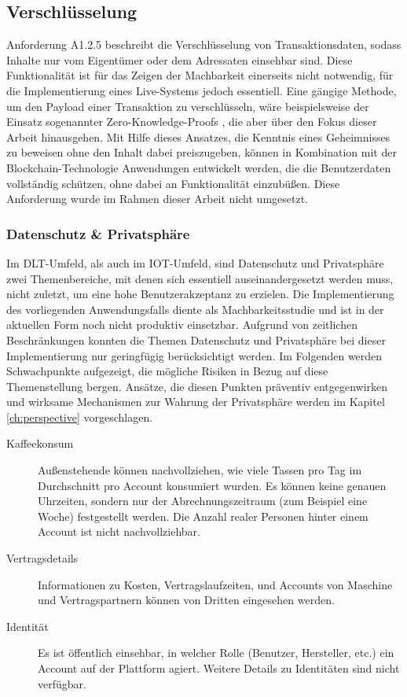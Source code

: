 \subsection{Verschlüsselung}
\label{subsec:implementation:requirements:encryption}
Anforderung A1.2.5 beschreibt die Verschlüsselung von Transaktionsdaten, sodass Inhalte nur vom Eigentümer oder dem Adressaten einsehbar sind. Diese Funktionalität ist für das Zeigen der Machbarkeit einerseits nicht notwendig, für die Implementierung eines Live-Systems jedoch essentiell. Eine gängige Methode, um den Payload einer Transaktion zu verschlüsseln, wäre beispielsweise der Einsatz sogenannter Zero-Knowledge-Proofs \cite{zeroknowledge2020}, die aber über den Fokus dieser Arbeit hinausgehen. Mit Hilfe dieses Ansatzes, die Kenntnis eines Geheimnisses zu beweisen ohne den Inhalt dabei preiszugeben, können in Kombination mit der Blockchain-Technologie Anwendungen entwickelt werden, die die Benutzerdaten vollständig schützen, ohne dabei an Funktionalität einzubüßen. Diese Anforderung wurde im Rahmen dieser Arbeit nicht umgesetzt.\\

\subsubsection{Datenschutz \& Privatsphäre}
\label{subsub:implementation:requirements:encryption:privacy}
Im \ac{DLT}-Umfeld, als auch im \ac{IOT}-Umfeld, sind Datenschutz und Privatsphäre zwei Themenbereiche, mit denen sich essentiell auseinandergesetzt werden muss, nicht zuletzt, um eine hohe Benutzerakzeptanz zu erzielen. Die Implementierung des vorliegenden Anwendungsfalls diente als Machbarkeitsstudie und ist in der aktuellen Form noch nicht produktiv einsetzbar. Aufgrund von zeitlichen Beschränkungen konnten die Themen Datenschutz und Privatsphäre bei dieser Implementierung nur geringfügig berücksichtigt werden. Im Folgenden werden Schwachpunkte aufgezeigt, die mögliche Risiken in Bezug auf diese Themenstellung bergen. Ansätze, die diesen Punkten präventiv entgegenwirken und wirksame Mechanismen zur Wahrung der Privatsphäre werden im Kapitel \ref{ch:perspective} vorgeschlagen.\\
\begin{description}
  \item[Kaffeekonsum] Außenstehende können nachvollziehen, wie viele Tassen pro Tag im Durchschnitt pro Account konsumiert wurden. Es können keine genauen Uhrzeiten, sondern nur der Abrechnungszeitraum (zum Beispiel eine Woche) festgestellt werden. Die Anzahl realer Personen hinter einem Account ist nicht nachvollziehbar.
  \item[Vertragsdetails] Informationen zu Kosten, Vertragslaufzeiten, und Accounts von Maschine und Vertragspartnern können von Dritten eingesehen werden.
  \item[Identität] Es ist öffentlich einsehbar, in welcher Rolle (Benutzer, Hersteller, etc.) ein Account auf der Plattform agiert. Weitere Details zu Identitäten sind nicht verfügbar.
\end{description}
